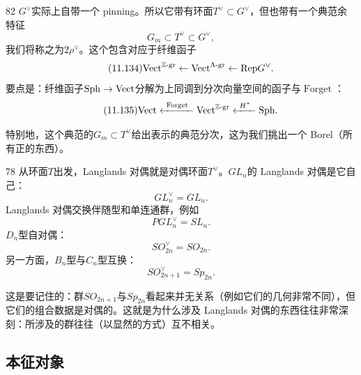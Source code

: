 \begin{srcrem}{82}
$G^{\vee}$实际上自带一个 pinning。所以它带有环面$T^{\vee}\subset G^{\vee}$，但也带有一个典范余特征%
\begin{equation}\tag{11.133}
G_m\subset T^{\vee}\subset G^{\vee},
\end{equation}
我们将称之为$2\rho^{\vee}$。这个包含对应于纤维函子
\begin{equation}\tag{11.134}
\mathrm{Vect}^{\mathbb{Z}\text{-gr}}\leftarrow\mathrm{Vect}^{\Lambda\text{-gr}}\leftarrow\mathrm{Rep} G^{\vee}.
\end{equation}
要点是：纤维函子$\mathrm{Sph}\to\mathrm{Vect}$分解为上同调到分次向量空间的函子与$\operatorname{Forget}$：
\begin{equation}\tag{11.135}
\Vect\xleftarrow{\ \operatorname{Forget}\ }\Vect^{\Z\text{-gr}}\xleftarrow{\ H^{*}\ }\sph.
\end{equation}
\end{srcrem}
特别地，这个典范的$G_m\subset T^{\vee}$给出表示的典范分次，这为我们挑出一个 Borel（所有正的东西）。

\begin{srcex}{78}
从环面$T$出发，Langlands 对偶就是对偶环面$T^{\vee}$。$GL_n$的 Langlands 对偶是它自己：
\begin{equation}\tag{11.136}
GL_n^{\vee}=GL_n.
\end{equation}
Langlands 对偶交换伴随型和单连通群，例如
\begin{equation}\tag{11.137}
PGL_n^{\vee}=SL_n.
\end{equation}
$D_n$型自对偶：
\begin{equation}\tag{11.138}
SO_{2n}^{\vee}=SO_{2n}.
\end{equation}
另一方面，$B_n$型与$C_n$型互换：
\begin{equation}\tag{11.139}
SO_{2n+1}^{\vee}=Sp_{2n}.
\end{equation}
\end{srcex}
这是要记住的：群$SO_{2n+1}$与$Sp_{2n}$看起来并无关系（例如它们的几何非常不同），但它们的组合数据是对偶的。这就是为什么涉及 Langlands 对偶的东西往往非常深刻：所涉及的群往往（以显然的方式）互不相关。

\subsection{本征对象}\label{sec:11-7-2}

